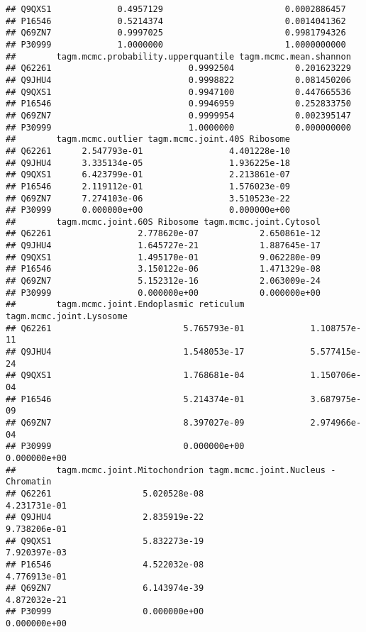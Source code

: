 \documentclass[]{article}
\begin{document}
\begin{verbatim}
## Q9QXS1             0.4957129                        0.0002886457
## P16546             0.5214374                        0.0014041362
## Q69ZN7             0.9997025                        0.9981794326
## P30999             1.0000000                        1.0000000000
##        tagm.mcmc.probability.upperquantile tagm.mcmc.mean.shannon
## Q62261                           0.9992504            0.201623229
## Q9JHU4                           0.9998822            0.081450206
## Q9QXS1                           0.9947100            0.447665536
## P16546                           0.9946959            0.252833750
## Q69ZN7                           0.9999954            0.002395147
## P30999                           1.0000000            0.000000000
##        tagm.mcmc.outlier tagm.mcmc.joint.40S Ribosome
## Q62261      2.547793e-01                 4.401228e-10
## Q9JHU4      3.335134e-05                 1.936225e-18
## Q9QXS1      6.423799e-01                 2.213861e-07
## P16546      2.119112e-01                 1.576023e-09
## Q69ZN7      7.274103e-06                 3.510523e-22
## P30999      0.000000e+00                 0.000000e+00
##        tagm.mcmc.joint.60S Ribosome tagm.mcmc.joint.Cytosol
## Q62261                 2.778620e-07            2.650861e-12
## Q9JHU4                 1.645727e-21            1.887645e-17
## Q9QXS1                 1.495170e-01            9.062280e-09
## P16546                 3.150122e-06            1.471329e-08
## Q69ZN7                 5.152312e-16            2.063009e-24
## P30999                 0.000000e+00            0.000000e+00
##        tagm.mcmc.joint.Endoplasmic reticulum tagm.mcmc.joint.Lysosome
## Q62261                          5.765793e-01             1.108757e-11
## Q9JHU4                          1.548053e-17             5.577415e-24
## Q9QXS1                          1.768681e-04             1.150706e-04
## P16546                          5.214374e-01             3.687975e-09
## Q69ZN7                          8.397027e-09             2.974966e-04
## P30999                          0.000000e+00             0.000000e+00
##        tagm.mcmc.joint.Mitochondrion tagm.mcmc.joint.Nucleus - Chromatin
## Q62261                  5.020528e-08                        4.231731e-01
## Q9JHU4                  2.835919e-22                        9.738206e-01
## Q9QXS1                  5.832273e-19                        7.920397e-03
## P16546                  4.522032e-08                        4.776913e-01
## Q69ZN7                  6.143974e-39                        4.872032e-21
## P30999                  0.000000e+00                        0.000000e+00

\end{verbatim}
\end{document}
